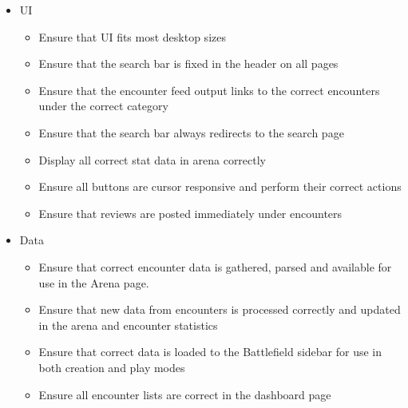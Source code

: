 \documentclass[12pt,a4paper]{report}
\begin{document}
	\begin{itemize}
		\item{UI}
		\begin{itemize}
			\item Ensure that UI fits most desktop sizes 
			\item Ensure that the search bar is fixed in the header on all pages
			\item Ensure that the encounter feed output links to the correct encounters under the correct category
			\item Ensure that the search bar always redirects to the search page
			\item Display all correct stat data in arena correctly
			\item Ensure all buttons are cursor responsive and perform their correct actions
			\item Ensure that reviews are posted immediately under encounters
		\end{itemize}
		\item Data
		\begin{itemize}
			\item Ensure that correct encounter data is gathered, parsed and available for use in the Arena page.
			\item Ensure that new data from encounters is processed correctly and updated in the arena and encounter statistics
			\item Ensure that correct data is loaded to the Battlefield sidebar for use in both creation and play modes
			\item Ensure all encounter lists are correct in the dashboard page
		\end{itemize}
	\end{itemize}
	

	
\end{document}
